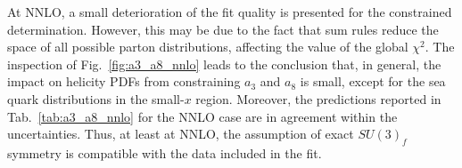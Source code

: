 
At NNLO, a small deterioration of the fit quality is presented for the constrained determination. However, this may be due to the fact that sum rules reduce the space of all possible parton distributions, affecting the value of the global $\chi^2$. The inspection of Fig.~\ref{fig:a3_a8_nnlo} leads to the conclusion that, in general, the impact on helicity PDFs from constraining $a_3$ and $a_8$ is small, except for the sea quark distributions in the small-$x$ region. Moreover, the predictions reported in Tab.~\ref{tab:a3_a8_nnlo} for the NNLO case are in agreement within the uncertainties. Thus, at least at NNLO, the assumption of exact $SU(3)_f$ symmetry is compatible with the data included in the fit.%

